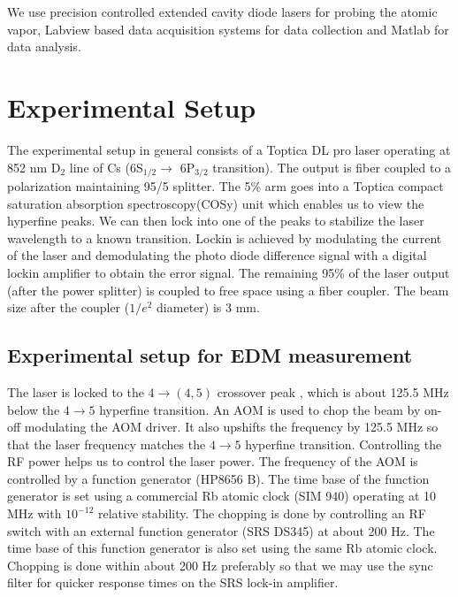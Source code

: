 We use precision controlled extended cavity diode lasers for probing the atomic vapor, Labview based data acquisition systems for data collection and Matlab for data analysis.


\chapter{Experimental Setup}

The experimental setup in general consists of a Toptica DL pro laser operating at 852 nm D$_2$ line of Cs (6S$_{1/2} \rightarrow $ 6P$_{3/2}$ transition). The output is fiber coupled to a polarization maintaining 95/5 splitter. The 5\% arm goes into a Toptica compact saturation absorption spectroscopy(COSy) unit which enables us to view the hyperfine peaks. We can then lock into one of the peaks to stabilize the laser wavelength to a known transition. Lockin is achieved by modulating the current of the laser and demodulating the photo diode difference signal with a digital lockin amplifier to obtain the error signal. The remaining 95\% of the laser output (after the power splitter) is coupled to free space using a fiber coupler. The beam size after the coupler ($1/e^2$ diameter) is 3 mm.

\section{Experimental setup for EDM measurement}

The laser is locked to the  $ 4 \rightarrow (4,5) $ crossover peak , which is about 125.5 MHz below the $ 4 \rightarrow 5 $ hyperfine transition. An AOM is used to chop the beam by on-off modulating the AOM driver. It also upshifts the frequency by 125.5 MHz so that the laser frequency matches the $4\rightarrow 5 $ hyperfine transition. Controlling the RF power helps us to control the laser power. The frequency of the AOM is controlled by a function generator (HP8656 B). The time base of the function generator is set using a commercial Rb atomic clock (SIM 940) operating at 10 MHz with $10^{-12}$ relative stability. The chopping is done by controlling an RF switch with an external function generator (SRS DS345) at about 200 Hz. The time base of this function generator is also set using the same Rb atomic clock. Chopping is done within about 200 Hz preferably so that we may use the sync filter for quicker response times on the SRS lock-in amplifier.

